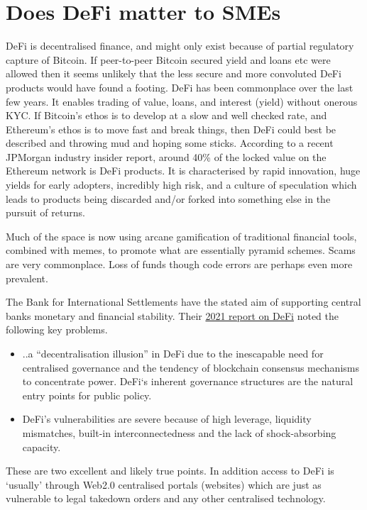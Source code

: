 \section{Does DeFi matter to SMEs }
DeFi is decentralised finance, and might only exist because of partial regulatory capture of Bitcoin. If peer-to-peer Bitcoin secured yield and loans etc were allowed then it seems unlikely that the less secure and more convoluted DeFi products would have found a footing. DeFi  has been commonplace over the last few years. It enables trading of value, loans, and interest (yield) without onerous KYC. If Bitcoin's ethos is to develop at a slow and well checked rate, and Ethereum's ethos is to move fast and break things, then DeFi could best be described and throwing mud and hoping some sticks. According to a recent JPMorgan industry insider report, around 40\% of the locked value on the Ethereum network is DeFi products. It is characterised by rapid innovation, huge yields for early adopters, incredibly high risk, and a culture of speculation which leads to products being discarded and/or forked into something else in the pursuit of returns.\par 
Much of the space is now using arcane gamification of traditional financial tools, combined with memes, to promote what are essentially pyramid schemes. Scams are very commonplace. Loss of funds though code errors are perhaps even more prevalent.\par
The Bank for International Settlements have the stated aim of supporting central banks monetary and financial stability. Their \href{https://www.bis.org/publ/qtrpdf/r_qt2112b.pdf}{2021 report on DeFi} noted the following key problems.
\begin{itemize}
\item ..a ``decentralisation illusion'' in DeFi due to the inescapable need for centralised governance and the tendency of blockchain consensus mechanisms to concentrate power. DeFi`s inherent governance structures are the natural entry points for public policy.
\item DeFi’s vulnerabilities are severe because of high leverage, liquidity mismatches, built-in interconnectedness and the lack of shock-absorbing capacity.
\end{itemize}
These are two excellent and likely true points. In addition access to DeFi is `usually' through Web2.0 centralised portals (websites) which are just as vulnerable to legal takedown orders and any other centralised technology.\par
